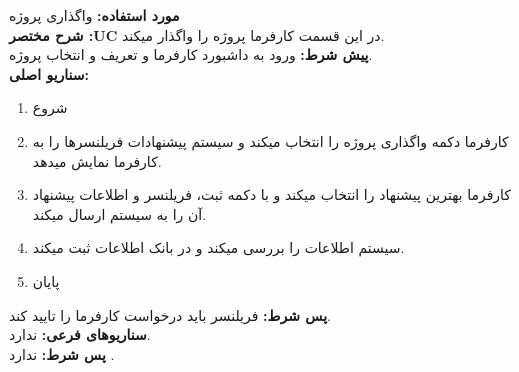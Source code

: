 \documentclass[20pt,a5paper]{report}
\begin{document}
\noindent \textbf{مورد استفاده:}
واگذاری پروژه
\\
\textbf{شرح مختصر :UC}
در این قسمت کارفرما پروژه را واگذار میکند.
\\
\textbf{پيش شرط:}
ورود به داشبورد کارفرما و تعریف و انتخاب پروژه.
\\
\textbf{سناريو اصلی:}
\begin{enumerate}
\item
شروع
\item
کارفرما دکمه واگذاری پروژه را انتخاب میکند و سیستم پیشنهادات فریلنسرها را به کارفرما نمایش میدهد.
\item
کارفرما بهترین پیشنهاد را انتخاب میکند و با دکمه ثبت، فریلنسر و اطلاعات پیشنهاد آن را به سیستم ارسال میکند.
\item
سیستم اطلاعات را بررسی میکند و در بانک اطلاعات ثبت میکند.
\item
پایان
\end{enumerate}
\textbf{پس شرط:}
فریلنسر باید درخواست کارفرما را تایید کند.
\\
\textbf{سناريوهای فرعی:}
ندارد.
\\
\textbf{پس شرط:}
ندارد .


\centering
\vfill
\lr{\LaTeX}
\end{document}
